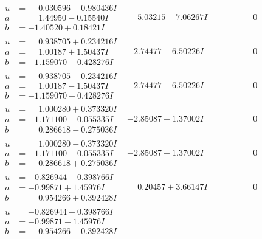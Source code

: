 \documentclass[1p]{elsarticle_modified}
\theoremstyle{definition}
\begin{document}
$$\begin{array}{c|c|c}
\begin{aligned}
u &= \phantom{-}0.030596 - 0.980436 I \\
a &= \phantom{-}1.44950 - 0.15540 I \\
b &= -1.40520 + 0.18421 I\end{aligned}
 & \phantom{-}5.03215 - 7.06267 I & \phantom{-0.000000 } 0 \\ \hline\begin{aligned}
u &= \phantom{-}0.938705 + 0.234216 I \\
a &= \phantom{-}1.00187 + 1.50437 I \\
b &= -1.159070 + 0.428276 I\end{aligned}
 & -2.74477 - 6.50226 I & \phantom{-0.000000 } 0 \\ \hline\begin{aligned}
u &= \phantom{-}0.938705 - 0.234216 I \\
a &= \phantom{-}1.00187 - 1.50437 I \\
b &= -1.159070 - 0.428276 I\end{aligned}
 & -2.74477 + 6.50226 I & \phantom{-0.000000 } 0 \\ \hline\begin{aligned}
u &= \phantom{-}1.000280 + 0.373320 I \\
a &= -1.171100 + 0.055335 I \\
b &= \phantom{-}0.286618 - 0.275036 I\end{aligned}
 & -2.85087 + 1.37002 I & \phantom{-0.000000 } 0 \\ \hline\begin{aligned}
u &= \phantom{-}1.000280 - 0.373320 I \\
a &= -1.171100 - 0.055335 I \\
b &= \phantom{-}0.286618 + 0.275036 I\end{aligned}
 & -2.85087 - 1.37002 I & \phantom{-0.000000 } 0 \\ \hline\begin{aligned}
u &= -0.826944 + 0.398766 I \\
a &= -0.99871 + 1.45976 I \\
b &= \phantom{-}0.954266 + 0.392428 I\end{aligned}
 & \phantom{-}0.20457 + 3.66147 I & \phantom{-0.000000 } 0 \\ \hline\begin{aligned}
u &= -0.826944 - 0.398766 I \\
a &= -0.99871 - 1.45976 I \\
b &= \phantom{-}0.954266 - 0.392428 I\end{aligned}

\end{array}$$
\end{document}
